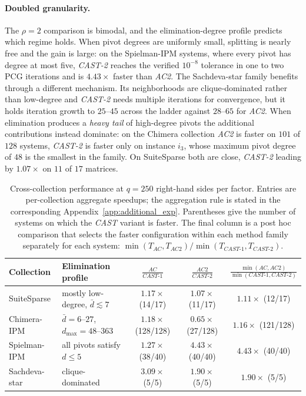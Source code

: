 \documentclass{article}
\newcommand{\CAST}{\textit{CAST}\xspace}
\newcommand{\CASTone}{\textit{CAST-1}\xspace}
\newcommand{\CASTtwo}{\textit{CAST-2}\xspace}
\newcommand{\AC}{\textit{AC}\xspace}
\newcommand{\ACtwo}{\textit{AC2}\xspace}
\newcommand{\1}{\mathbbm{1}}
\theoremstyle{plain}
\begin{document}
\paragraph{Doubled granularity.}
The $\rho=2$ comparison is bimodal, and the elimination-degree profile
predicts which regime holds. When pivot degrees are uniformly small,
splitting is nearly free and the gain is large: on the Spielman-IPM
systems, where every pivot has degree at most five, \CASTtwo{} reaches
the verified $10^{-8}$ tolerance in one to two PCG iterations and is
$4.43\times$ faster than \ACtwo{}. The Sachdeva-star family benefits
through a different mechanism. Its neighborhoods are clique-dominated
rather than low-degree and \CASTtwo{} needs multiple iterations for
convergence, but it holds iteration growth to $25$--$45$ across
the ladder against $28$--$65$ for \ACtwo{}. When
elimination produces a \emph{heavy tail} of high-degree pivots the additional
contributions instead dominate: on the Chimera collection \ACtwo{} is
faster on $101$ of $128$ systems, \CASTtwo{} is faster only on instance
$i_3$, whose maximum pivot degree of $48$ is the smallest in the
family. On Suite\-Sparse both are close, \CASTtwo{} leading by
$1.07\times$ on $11$ of $17$ matrices.

\begin{table}[t]
\centering
\caption{Cross-collection performance at $q=250$ right-hand sides per
factor. Entries are per-collection aggregate speedups; the aggregation rule
is stated in the corresponding Appendix~\ref{app:additional_exp}. Parentheses give the number of systems on which the
\CAST variant is faster. The final
column is a post hoc  comparison that selects the faster
configuration within each method family separately for each system:
$\min(T_{\AC},T_{\ACtwo})/
 \min(T_{\CASTone},T_{\CASTtwo})$.}
\label{tab:cross_collection}
\begin{tabular}{l l c c c}
\toprule
Collection
& Elimination profile
& $\frac{\AC}{\CASTone}$
& $\frac{\ACtwo}{\CASTtwo}$
& $\frac{\min(\AC,\ACtwo)}
        {\min(\CASTone,\CASTtwo)}$ \\
\midrule
Suite\-Sparse 
& mostly low-degree, $\bar d\lesssim7$

& $1.17\times$ (14/17)
& $1.07\times$ (11/17)
& $1.11\times$ (12/17) \\

Chimera-IPM 
& $\bar d=6$--$27$, $d_{\max}=48$--$363$

& $1.18\times$ (128/128)
& $0.65\times$ (27/128)
& $1.16\times$ (121/128) \\

Spielman-IPM 
& all pivots satisfy $d\leq5$

& $1.27\times$ (38/40)
& $4.43\times$ (40/40)
& $4.43\times$ (40/40) \\

Sachdeva-star 
& clique-dominated

& $3.09\times$ (5/5)
& $1.90\times$ (5/5)
& $1.90\times$ (5/5) \\
\bottomrule
\end{tabular}
\end{table}
\end{document}
